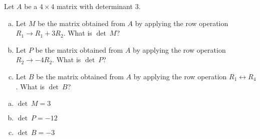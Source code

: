 
\begin{exerciseStatement}


Let \(A\) be a \(4 \times 4\) matrix with determinant \( 3 \).


\begin{enumerate}[(a)]
\item Let \(M\) be the matrix obtained from \(A\) by applying the row operation \( R_1 \to R_1 + 3R_2 \). What is \(\operatorname{det}\ M\)?
\item Let \(P\) be the matrix obtained from \(A\) by applying the row operation \( R_2 \to -4R_2 \). What is \(\operatorname{det}\ P\)?
\item Let \(B\) be the matrix obtained from \(A\) by applying the row operation \( R_1 \leftrightarrow R_4 \). What is \(\operatorname{det}\ B\)?
\end{enumerate}
    
\end{exerciseStatement}
    
\begin{exerciseAnswer} 

\begin{enumerate}[(a)]
\item \(\operatorname{det}\ M= 3 \)
\item \(\operatorname{det}\ P= -12 \)
\item \(\operatorname{det}\ B= -3 \)
\end{enumerate}
    
\end{exerciseAnswer}
    
